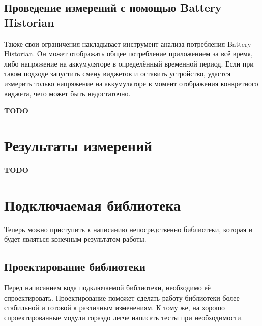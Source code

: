 \documentclass[a4paper,14pt]{extarticle} %
\begin{document}
	\subsection{Проведение измерений с помощью Battery Historian}
	
	Также свои ограничения накладывает инструмент анализа потребления Battery Historian. Он может отображать общее потребление приложением за всё время, либо напряжение на аккумуляторе в определённый временной период. Если при таком подходе запустить смену виджетов и оставить устройство, удастся измерить только напряжение на аккумуляторе в момент отображения конкретного виджета, чего может быть недостаточно.
	
	\textbf{\Huge TODO}
	
	\newpage
	\section{Результаты измерений}
	
	\textbf{\Huge TODO}
	
	\newpage
	\section{Подключаемая библиотека}
	
	Теперь можно приступить к написанию непосредственно библиотеки, которая и будет являться конечным результатом работы.
	
	\subsection{Проектирование библиотеки}
	
	Перед написанием кода подключаемой библиотеки, необходимо её спроектировать. Проектирование поможет сделать работу библиотеки более стабильной и готовой к различным изменениям. К тому же, на хорошо спроектированные модули гораздо легче написать тесты при необходимости. 
	
\end{document}
